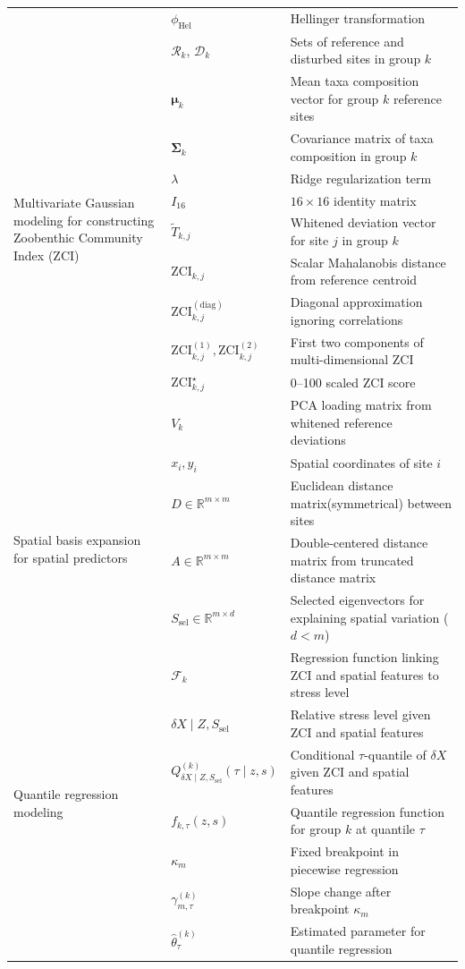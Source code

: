 \begin{table}[!h]
\begin{tabular}{lll}
\multirow{12}{*}{\parbox{3cm}{\centering
    Multivariate Gaussian modeling for constructing Zoobenthic Community Index (ZCI)
 }} 
& $\phi_{\mathrm{Hel}}$ & Hellinger transformation \\
& $\mathcal{R}_k$, $\mathcal{D}_k$ & Sets of reference and disturbed sites in group $k$ \\
& $\boldsymbol{\mu}_k$ & Mean taxa composition vector for group $k$ reference sites \\
& $\boldsymbol{\Sigma}_k$ & Covariance matrix of taxa composition in group $k$ \\
& $\lambda$ & Ridge regularization term \\
& $I_{16}$ & $16\times16$ identity matrix \\
& $\tilde{T}_{k,j}$ & Whitened deviation vector for site $j$ in group $k$ \\
& $\mathrm{ZCI}_{k,j}$ & Scalar Mahalanobis distance from reference centroid \\
& $\mathrm{ZCI}^{(\mathrm{diag})}_{k,j}$ & Diagonal approximation ignoring correlations \\
& $\mathrm{ZCI}^{(1)}_{k,j}, \mathrm{ZCI}^{(2)}_{k,j}$ & First two components of multi-dimensional ZCI \\
& $\mathrm{ZCI}^\star_{k,j}$ & 0--100 scaled ZCI score \\
& $V_k$ & PCA loading matrix from whitened reference deviations \\
\midrule

\multirow{4}{*}{\parbox{3cm}{\centering
    Spatial basis expansion for spatial predictors
}} 
& $x_i, y_i$ & Spatial coordinates of site $i$ \\
& $D \in \mathbb{R}^{m \times m}$ & Euclidean distance matrix(symmetrical) between sites \\
& $A \in \mathbb{R}^{m \times m}$ & Double-centered distance matrix from truncated distance matrix \\
& $S_{\text{sel}} \in \mathbb{R}^{m \times d}$ & Selected eigenvectors for explaining spatial variation (\(d < m\)) \\
\midrule

\multirow{7}{*}{\parbox{3cm}{\centering Quantile regression modeling}} 
& $\mathcal{F}_{k}$ & Regression function linking ZCI and spatial features to stress level \\
& $\delta X\mid Z, S_{\text{sel}}$ & Relative stress level given ZCI and spatial features \\
& $Q_{\delta X\mid Z, S_{\text{sel}}}^{(k)}(\tau \mid z, s)$ & Conditional $\tau$-quantile of $\delta X$ given ZCI and spatial features \\
& $f_{k, \tau} (z, s)$ & Quantile regression function for group $k$ at quantile $\tau$ \\
& $\kappa_m$ & Fixed breakpoint in piecewise regression \\
& $\gamma_{m,\tau}^{(k)}$ & Slope change after breakpoint $\kappa_m$ \\
& $\hat \theta_{\tau}^{(k)}$ & Estimated parameter for quantile regression \\
\midrule


\end{tabular}
\end{table}
